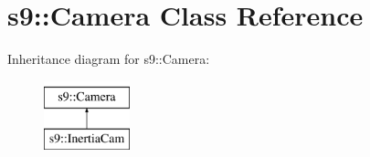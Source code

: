 \hypertarget{classs9_1_1Camera}{\section{s9\-:\-:\-Camera \-Class \-Reference}
\label{classs9_1_1Camera}
}
\-Inheritance diagram for s9\-:\-:\-Camera\-:\begin{figure}[H]
\begin{center}
\leavevmode
\includegraphics[height=2.000000cm]{classs9_1_1Camera}
\end{center}
\end{figure}

